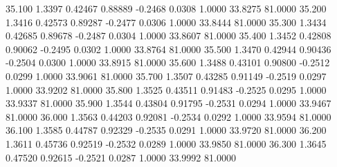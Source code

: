   35.100   1.3397   0.42467   0.88889  -0.2468   0.0308   1.0000  33.8275  81.0000
  35.200   1.3416   0.42573   0.89287  -0.2477   0.0306   1.0000  33.8444  81.0000
  35.300   1.3434   0.42685   0.89678  -0.2487   0.0304   1.0000  33.8607  81.0000
  35.400   1.3452   0.42808   0.90062  -0.2495   0.0302   1.0000  33.8764  81.0000
  35.500   1.3470   0.42944   0.90436  -0.2504   0.0300   1.0000  33.8915  81.0000
  35.600   1.3488   0.43101   0.90800  -0.2512   0.0299   1.0000  33.9061  81.0000
  35.700   1.3507   0.43285   0.91149  -0.2519   0.0297   1.0000  33.9202  81.0000
  35.800   1.3525   0.43511   0.91483  -0.2525   0.0295   1.0000  33.9337  81.0000
  35.900   1.3544   0.43804   0.91795  -0.2531   0.0294   1.0000  33.9467  81.0000
  36.000   1.3563   0.44203   0.92081  -0.2534   0.0292   1.0000  33.9594  81.0000
  36.100   1.3585   0.44787   0.92329  -0.2535   0.0291   1.0000  33.9720  81.0000
  36.200   1.3611   0.45736   0.92519  -0.2532   0.0289   1.0000  33.9850  81.0000
  36.300   1.3645   0.47520   0.92615  -0.2521   0.0287   1.0000  33.9992  81.0000
